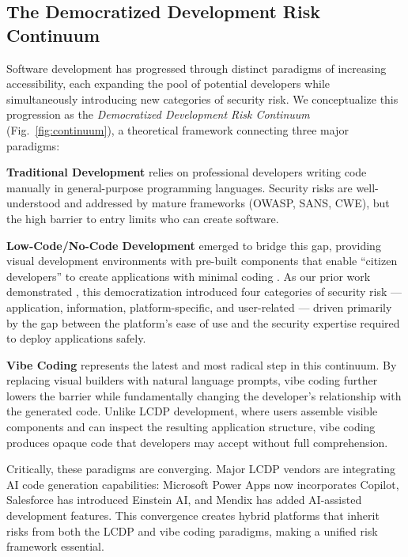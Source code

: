 \documentclass[preprint,review,12pt]{elsarticle}
\begin{document}
\subsection{The Democratized Development Risk Continuum}
\label{subsec:continuum}

Software development has progressed through distinct paradigms of increasing accessibility, each expanding the pool of potential developers while simultaneously introducing new categories of security risk. We conceptualize this progression as the \textit{Democratized Development Risk Continuum} (Fig.~\ref{fig:continuum}), a theoretical framework connecting three major paradigms:

\textbf{Traditional Development} relies on professional developers writing code manually in general-purpose programming languages. Security risks are well-understood and addressed by mature frameworks (OWASP, SANS, CWE), but the high barrier to entry limits who can create software.

\textbf{Low-Code/No-Code Development} emerged to bridge this gap, providing visual development environments with pre-built components that enable ``citizen developers'' to create applications with minimal coding \cite{woo2020rise, sahay2020supporting}. As our prior work demonstrated \cite{hathnagoda2024assessing}, this democratization introduced four categories of security risk --- application, information, platform-specific, and user-related --- driven primarily by the gap between the platform's ease of use and the security expertise required to deploy applications safely.

\textbf{Vibe Coding} represents the latest and most radical step in this continuum. By replacing visual builders with natural language prompts, vibe coding further lowers the barrier while fundamentally changing the developer's relationship with the generated code. Unlike LCDP development, where users assemble visible components and can inspect the resulting application structure, vibe coding produces opaque code that developers may accept without full comprehension.

Critically, these paradigms are converging. Major LCDP vendors are integrating AI code generation capabilities: Microsoft Power Apps now incorporates Copilot, Salesforce has introduced Einstein AI, and Mendix has added AI-assisted development features. This convergence creates hybrid platforms that inherit risks from both the LCDP and vibe coding paradigms, making a unified risk framework essential.
\end{document}
